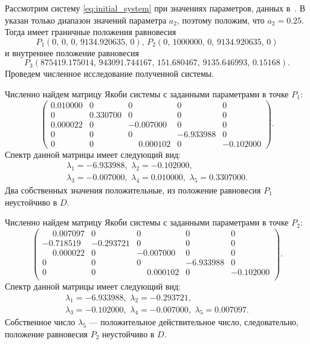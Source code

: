 \documentclass[14pt,a4paper]{extarticle}
\begin{document}
	\begin{example}
		Рассмотрим систему \ref{eq:initial_system} при значениях параметров, данных в~\cite{model_params}. В \cite{model_params} указан только диапазон значений параметра $a_2$, поэтому положим, что $a_2=0.25$. Тогда имеет граничные положения равновесия
		\[P_1\left(0,\,0,\,0,\,9134.920635,\,0\right),\, P_2\left(0,\,1000000,\,0,\,9134.920635,\,0\right)\]
		и внутреннее положение равновесия
		\[P_3\left(875419.175014,\,943091.744167,\,151.680467,\,9135.646993,\,0.15168\right).\] 
		Проведем численное исследование полученной системы.
		
		Численно найдем матрицу Якоби системы с заданными параметрами в точке $P_1$: 
		\[\begin{pmatrix}
			0.010000& 0       & 0       & 0       & 0\\
			0       & 0.330700& 0       & 0       & 0\\
			0.000022& 0       &-0.007000& 0       & 0\\
			0       & 0       & 0       &-6.933988& 0\\
			0       & 0       &\phantom{-}0.000102& 0       &-0.102000
		\end{pmatrix}.\]
		Спектр данной матрицы имеет следующий вид:
		\begin{multline*}
			\lambda_1=-6.933988,\,\, \lambda_2=-0.102000,\\
			\lambda_3=-0.007000,\,\, \lambda_4=0.010000,\,\, \lambda_5=0.3307000.
		\end{multline*}
		Два собственных значения положительные, из положение равновесия $P_1$ неустойчиво в $D$.
		
		Численно найдем матрицу Якоби системы с заданными параметрами  в точке $P_2$: 
		\[\begin{pmatrix}
			\phantom{-}0.007097& 0 &      0 &      0   &    0\\
			-0.718519&-0.293721& 0  &     0    &   0\\
			\phantom{-}0.000022& 0  &    -0.007000 &   0     &  0\\
			0     &  0   &     0    &    -6.933988&0\\
			0  &      0    &    \phantom{-}0.000102 & 0    &   -0.102000\\
		\end{pmatrix}.\]
		Спектр данной матрицы имеет следующий вид:
		\begin{multline*}
		\lambda_1=-6.933988,\,\, \lambda_2=-0.293721,\\
		\lambda_3=-0.102000,\,\, \lambda_4=-0.007000,\,\, \lambda_5=0.007097.
		\end{multline*}
		Собственное число $\lambda_5$ --- положительное действительное число, следовательно, положение равновесия $P_2$ неустойчиво в $D$.
		

\end{example}
\end{document}

